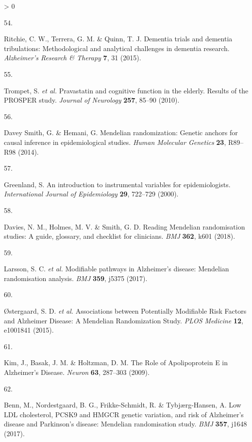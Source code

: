 \documentclass[a4paper, twoside]{templates/ociamthesis}
\newlength{\cslhangindent}
\newlength{\csllabelwidth}
\newenvironment{CSLReferences}[3] %
 {%
  \setlength{\parindent}{0pt}
  \ifodd #1 \everypar{\setlength{\hangindent}{\cslhangindent}}\ignorespaces\fi
  \ifnum #2 > 0
  \setlength{\parskip}{#2\baselineskip}
  \fi
 }%
 {}
\newcommand{\CSLLeftMargin}[1]{\parbox[t]{\maxof{\widthof{#1}}{\csllabelwidth}}{#1}}
\newcommand{\CSLRightInline}[1]{\parbox[t]{\linewidth - \csllabelwidth}{#1}}
\begin{document}
\begin{CSLReferences}{0}{0}
\leavevmode\hypertarget{ref-ritchie2015}{}%
\CSLLeftMargin{54. }
\CSLRightInline{Ritchie, C. W., Terrera, G. M. \& Quinn, T. J. Dementia trials and dementia tribulations: Methodological and analytical challenges in dementia research. \emph{Alzheimer's Research \& Therapy} \textbf{7}, 31 (2015).}

\leavevmode\hypertarget{ref-trompet2010}{}%
\CSLLeftMargin{55. }
\CSLRightInline{Trompet, S. \emph{et al.} Pravastatin and cognitive function in the elderly. {Results} of the {PROSPER} study. \emph{Journal of Neurology} \textbf{257}, 85--90 (2010).}

\leavevmode\hypertarget{ref-daveysmith2014}{}%
\CSLLeftMargin{56. }
\CSLRightInline{Davey Smith, G. \& Hemani, G. Mendelian randomization: Genetic anchors for causal inference in epidemiological studies. \emph{Human Molecular Genetics} \textbf{23}, R89--R98 (2014).}

\leavevmode\hypertarget{ref-greenland2000}{}%
\CSLLeftMargin{57. }
\CSLRightInline{Greenland, S. An introduction to instrumental variables for epidemiologists. \emph{International Journal of Epidemiology} \textbf{29}, 722--729 (2000).}

\leavevmode\hypertarget{ref-davies2018}{}%
\CSLLeftMargin{58. }
\CSLRightInline{Davies, N. M., Holmes, M. V. \& Smith, G. D. Reading {Mendelian} randomisation studies: A guide, glossary, and checklist for clinicians. \emph{BMJ} \textbf{362}, k601 (2018).}

\leavevmode\hypertarget{ref-larsson2017c}{}%
\CSLLeftMargin{59. }
\CSLRightInline{Larsson, S. C. \emph{et al.} Modifiable pathways in {Alzheimer}'s disease: {Mendelian} randomisation analysis. \emph{BMJ} \textbf{359}, j5375 (2017).}

\leavevmode\hypertarget{ref-ostergaard2015}{}%
\CSLLeftMargin{60. }
\CSLRightInline{Østergaard, S. D. \emph{et al.} Associations between {Potentially Modifiable Risk Factors} and {Alzheimer Disease}: {A Mendelian Randomization Study}. \emph{PLOS Medicine} \textbf{12}, e1001841 (2015).}

\leavevmode\hypertarget{ref-kim2009}{}%
\CSLLeftMargin{61. }
\CSLRightInline{Kim, J., Basak, J. M. \& Holtzman, D. M. The {Role} of {Apolipoprotein E} in {Alzheimer}'s {Disease}. \emph{Neuron} \textbf{63}, 287--303 (2009).}

\leavevmode\hypertarget{ref-benn2017}{}%
\CSLLeftMargin{62. }
\CSLRightInline{Benn, M., Nordestgaard, B. G., Frikke-Schmidt, R. \& Tybjærg-Hansen, A. Low {LDL} cholesterol, {PCSK9} and {HMGCR} genetic variation, and risk of {Alzheimer}'s disease and {Parkinson}'s disease: {Mendelian} randomisation study. \emph{BMJ} \textbf{357}, j1648 (2017).}


\end{CSLReferences}
\end{document}
